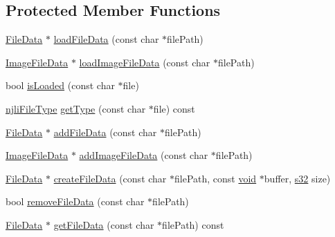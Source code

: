 \subsection*{Protected Member Functions}
\begin{DoxyCompactItemize}
\item 
\mbox{\hyperlink{structnjli_1_1_world_resource_loader_1_1_file_data}{File\+Data}} $\ast$ \mbox{\hyperlink{classnjli_1_1_world_resource_loader_a4904946c60cf5f1dc54b98b902d72f0a}{load\+File\+Data}} (const char $\ast$file\+Path)
\item 
\mbox{\hyperlink{structnjli_1_1_world_resource_loader_1_1_image_file_data}{Image\+File\+Data}} $\ast$ \mbox{\hyperlink{classnjli_1_1_world_resource_loader_aba1ff910a058021bf41018e8c27d4bc4}{load\+Image\+File\+Data}} (const char $\ast$file\+Path)
\item 
bool \mbox{\hyperlink{classnjli_1_1_world_resource_loader_a1a1d58baf3b8d4fa094d565a795265f7}{is\+Loaded}} (const char $\ast$file)
\item 
\mbox{\hyperlink{namespacenjli_a3699b2e13e71094f00d7f0141e131106}{njli\+File\+Type}} \mbox{\hyperlink{classnjli_1_1_world_resource_loader_a1b95c427bca6bf7cbaf0ae7ee083d744}{get\+Type}} (const char $\ast$file) const
\item 
\mbox{\hyperlink{structnjli_1_1_world_resource_loader_1_1_file_data}{File\+Data}} $\ast$ \mbox{\hyperlink{classnjli_1_1_world_resource_loader_afbb6af85a0262734c5fd0b78461bde82}{add\+File\+Data}} (const char $\ast$file\+Path)
\item 
\mbox{\hyperlink{structnjli_1_1_world_resource_loader_1_1_image_file_data}{Image\+File\+Data}} $\ast$ \mbox{\hyperlink{classnjli_1_1_world_resource_loader_a7b630b94f3d5b5ee3b599e1585e51dea}{add\+Image\+File\+Data}} (const char $\ast$file\+Path)
\item 
\mbox{\hyperlink{structnjli_1_1_world_resource_loader_1_1_file_data}{File\+Data}} $\ast$ \mbox{\hyperlink{classnjli_1_1_world_resource_loader_a0563ad167a4c6552f0535ae191e6e2a0}{create\+File\+Data}} (const char $\ast$file\+Path, const \mbox{\hyperlink{_thread_8h_af1e856da2e658414cb2456cb6f7ebc66}{void}} $\ast$buffer, \mbox{\hyperlink{_util_8h_aa62c75d314a0d1f37f79c4b73b2292e2}{s32}} size)
\item 
bool \mbox{\hyperlink{classnjli_1_1_world_resource_loader_ac3a031dc592f5907a2e7579c4a98739f}{remove\+File\+Data}} (const char $\ast$file\+Path)
\item 
\mbox{\hyperlink{structnjli_1_1_world_resource_loader_1_1_file_data}{File\+Data}} $\ast$ \mbox{\hyperlink{classnjli_1_1_world_resource_loader_ab2be064bf5d8defdf6838737ee54ac57}{get\+File\+Data}} (const char $\ast$file\+Path) const
\end{DoxyCompactItemize}
